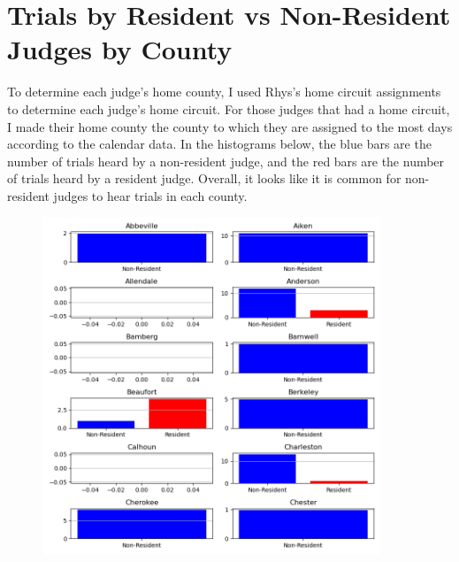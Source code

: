 \documentclass[11pt]{article}
\begin{document}
\section{Trials by Resident vs Non-Resident Judges by County}
  To determine each judge's home county, I used Rhys's home circuit assignments to determine each judge's home circuit. For those judges that had a home circuit, I made their home county the county to which they are assigned to the most days according to the calendar data. In the histograms below, the blue bars are the number of trials heard by a non-resident judge, and the red bars are the number of trials heard by a resident judge.  Overall, it looks like it is common for non-resident judges to hear trials in each county. 
    \begin{figure}[H]
      \centering
      \includegraphics[width=0.9\textwidth]{../../../output/figures/Exploration/county_trial_hist_0.png}
    \end{figure}
\end{document}
